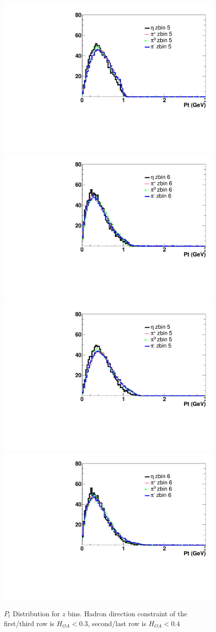 \begin{figure}[H]
\includegraphics[width=.27\textwidth,natwidth=250,natheight=100]{figure_fiducial/had0.3_z0.3/Pt_distri_for_zbin_5_norm_had03z03.pdf}
\includegraphics[width=.27\textwidth,natwidth=250,natheight=100]{figure_fiducial/had0.3_z0.3/Pt_distri_for_zbin_6_norm_had03z03.pdf}\hfill
\includegraphics[width=.27\textwidth,natwidth=250,natheight=100]{figure_fiducial/had0.4_z0.3/Pt_distri_for_zbin_5_norm_had04z03.pdf}
\includegraphics[width=.27\textwidth,natwidth=250,natheight=100]{figure_fiducial/had0.4_z0.3/Pt_distri_for_zbin_6_norm_had04z03.pdf}\hfill
\caption{$P_t$ Distribution for $z$ bins. Hadron direction constraint of the first/third row is $H_{OA}<0.3$, second/last row is $H_{OA}<0.4$}
\end{figure}
